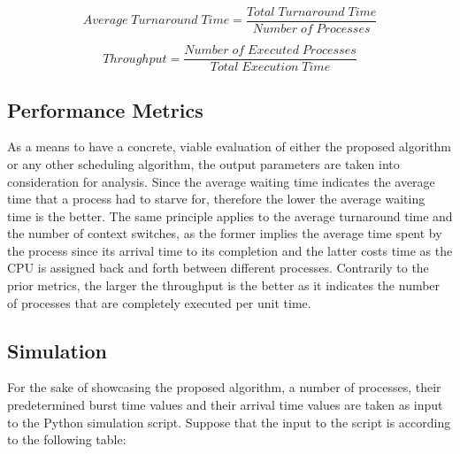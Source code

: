 \documentclass[conference]{IEEEtran}
\begin{document}
\begin{equation}
    Average\; Turnaround\; Time =  \frac{Total \; Turnaround \; Time}{Number \; of \; Processes} \label{eq3}
\end{equation}

\begin{equation}
    Throughput =  \frac{Number \; of \; Executed \; Processes}{Total \; Execution \; Time} \label{eq4}
\end{equation}

\vspace{4mm}


\subsection{Performance Metrics}

As a means to have a concrete, viable evaluation of either the proposed algorithm or any other scheduling algorithm, the output parameters are taken into consideration for analysis. Since the average waiting time indicates the average time that a  process had to starve for, therefore the lower the average waiting time is the better. The same principle applies to the average turnaround time and the number of context switches, as the former implies the average time spent by the process since its arrival time to its completion and the latter costs time as the CPU is assigned back and forth between different processes. Contrarily to the prior metrics, the larger the throughput is the better as it indicates the number of processes that are completely executed per unit time.


\subsection{Simulation}

For the sake of showcasing the proposed algorithm, a number of processes, their predetermined burst time values and their arrival time values are taken as input to the Python simulation script. Suppose that the input to the script is according to the following table:
\end{document}
